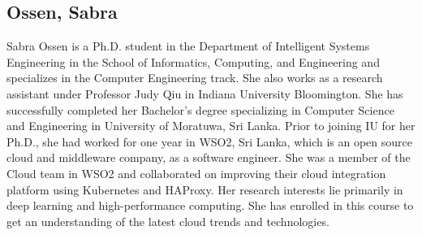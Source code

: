 \subsection{Ossen, Sabra}
Sabra Ossen is a Ph.D. student in the Department of Intelligent Systems Engineering in the School of Informatics, Computing, and Engineering and specializes in the Computer Engineering track. She also works as a research assistant under Professor Judy Qiu in Indiana University Bloomington. She has successfully completed her Bachelor's degree specializing in Computer Science and Engineering in University of Moratuwa, Sri Lanka. Prior to joining IU for her Ph.D., she had worked for one year in WSO2, Sri Lanka, which is an open source cloud and middleware company, as a software engineer. She was a member of the Cloud team in WSO2 and collaborated on improving their cloud integration platform using Kubernetes and HAProxy. Her research interests lie primarily in deep learning and high-performance computing. She has enrolled in this course to get an understanding of the latest cloud trends and technologies.
